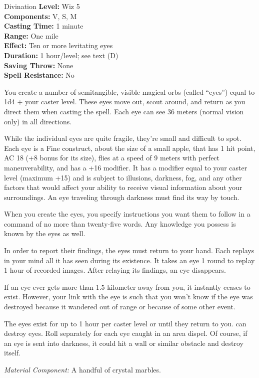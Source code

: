 {Divination}
{
	\textbf{Level:}
	Wiz 5\\
	\textbf{Components:}
	V, S, M\\
	\textbf{Casting Time:}
	1 minute\\
	\textbf{Range:}
	One mile\\
	\textbf{Effect:}
	Ten or more levitating eyes\\
	\textbf{Duration:}
	1 hour/level; see text (D)\\
	\textbf{Saving Throw:}
	None\\
	\textbf{Spell Resistance:}
	No\\
}
{
	You create a number of semitangible, visible magical orbs (called ``eyes'') equal to 1d4 + your caster level. These eyes move out, scout around, and return as you direct them when casting the spell. Each eye can see 36 meters (normal vision only) in all directions.

	While the individual eyes are quite fragile, they're small and difficult to spot. Each eye is a Fine construct, about the size of a small apple, that has 1 hit point, AC 18 (+8 bonus for its size), flies at a speed of 9 meters with perfect maneuverability, and has a +16  modifier. It has a  modifier equal to your caster level (maximum +15) and is subject to illusions, darkness, fog, and any other factors that would affect your ability to receive visual information about your surroundings. An eye traveling through darkness must find its way by touch.

	When you create the eyes, you specify instructions you want them to follow in a command of no more than twenty-five words. Any knowledge you possess is known by the eyes as well.

	In order to report their findings, the eyes must return to your hand. Each replays in your mind all it has seen during its existence. It takes an eye 1 round to replay 1 hour of recorded images. After relaying its findings, an eye disappears.

	If an eye ever gets more than 1.5 kilometer away from you, it instantly ceases to exist. However, your link with the eye is such that you won't know if the eye was destroyed because it wandered out of range or because of some other event.

	The eyes exist for up to 1 hour per caster level or until they return to you.  can destroy eyes. Roll separately for each eye caught in an area dispel. Of course, if an eye is sent into darkness, it could hit a wall or similar obstacle and destroy itself.

	\textit{Material Component:}
	A handful of crystal marbles.

}
